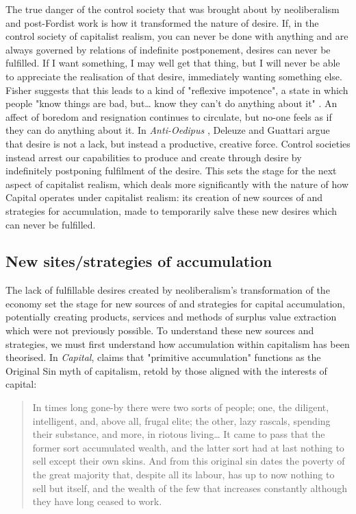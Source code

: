 The true danger of the control society that was brought about by neoliberalism and post-Fordist work is how it transformed the nature of desire. If, in the control society of capitalist realism, you can never be done with anything and are always governed by relations of indefinite postponement, desires can never be fulfilled. If I want something, I may well get that thing, but I will never be able to appreciate the realisation of that desire, immediately wanting something else. Fisher suggests that this leads to a kind of "reflexive impotence", a state in which people "know things are bad, but\ldots{} know they can't do anything about it" \citep[21]{fisher_capitalist_2009}. An affect of boredom and resignation continues to circulate, but no-one feels as if they can do anything about it. In \emph{Anti-Oedipus} \citet{deleuze_anti-oedipus:_1983}, Deleuze and Guattari argue that desire is not a lack, but instead a productive, creative force. Control societies instead arrest our capabilities to produce and create through desire by indefinitely postponing fulfilment of the desire.  This sets the stage for the next aspect of capitalist realism, which deals more significantly with the nature of how Capital operates under capitalist realism: its creation of new sources of and strategies for accumulation, made to temporarily salve these new desires which can never be fulfilled.


\subsection{New sites/strategies of accumulation }
\label{new-sitesstrategies-of-accumulation}

The lack of fulfillable desires created by neoliberalism's transformation of the economy set the stage for  new sources of and strategies for capital accumulation, potentially creating products, services and methods of surplus value extraction which were not previously possible. To understand these new sources and strategies, we must first understand how accumulation within capitalism has been theorised. In \emph{Capital},  \citet[736]{marx_capital_1889} claims that "primitive accumulation" functions as the Original Sin myth of capitalism, retold by those aligned with the interests of capital:

\begin{quote}
In times long gone-by there were two sorts of people; one, the diligent, intelligent, and, above all, frugal elite; the other, lazy rascals, spending their substance, and more, in riotous living\ldots{} It came to pass that the former sort accumulated wealth, and the latter sort had at last nothing to sell except their own skins. And from this original sin dates the poverty of the great majority that, despite all its labour, has up to now nothing to sell but itself, and the wealth of the few that increases constantly although they have long ceased to work.
\end{quote}

